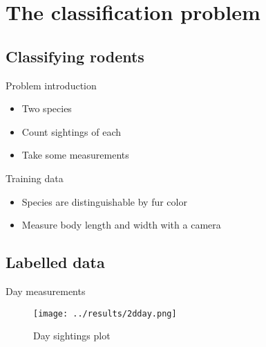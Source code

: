 \section{The classification problem}

\subsection{Classifying rodents}

\begin{frame}{Problem introduction}
  \begin{itemize}
    \item Two species
    \item Count sightings of each
    \item Take some measurements
  \end{itemize}


\end{frame}

\begin{frame}{Training data}
  \begin{itemize}
    \item Species are distinguishable by fur color
    \item Measure body length and width with a camera
  \end{itemize}


\end{frame}

\subsection{Labelled data}

\begin{frame}{Day measurements}
  \begin{figure}[!htbp]
    \centering
    \small{\caption{Day sightings plot}}
    \texttt{[image: ../results/2dday.png]}
  \end{figure}


\end{frame}

